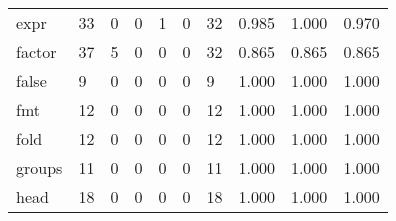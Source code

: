 \begin{longtable}{lp{2.0cm}p{2.0cm}p{2.0cm}p{2.0cm}p{2.0cm}p{2.0cm}p{2.0cm}p{2.0cm}p{2.0cm}}
expr      &                     33 &                                             0 &                                            0 &                                           1 &                                            0 &                                         32 &                                0.985 &                                  1.000 &                                0.970 \\
factor    &                     37 &                                             5 &                                            0 &                                           0 &                                            0 &                                         32 &                                0.865 &                                  0.865 &                                0.865 \\
false     &                      9 &                                             0 &                                            0 &                                           0 &                                            0 &                                          9 &                                1.000 &                                  1.000 &                                1.000 \\
fmt       &                     12 &                                             0 &                                            0 &                                           0 &                                            0 &                                         12 &                                1.000 &                                  1.000 &                                1.000 \\
fold      &                     12 &                                             0 &                                            0 &                                           0 &                                            0 &                                         12 &                                1.000 &                                  1.000 &                                1.000 \\
groups    &                     11 &                                             0 &                                            0 &                                           0 &                                            0 &                                         11 &                                1.000 &                                  1.000 &                                1.000 \\
head      &                     18 &                                             0 &                                            0 &                                           0 &                                            0 &                                         18 &                                1.000 &                                  1.000 &                                1.000 \\

\end{longtable}
